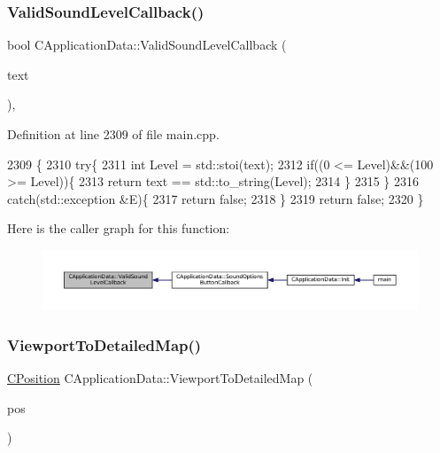 \subsubsection{\texorpdfstring{Valid\+Sound\+Level\+Callback()}{ValidSoundLevelCallback()}}
{\footnotesize\ttfamily bool C\+Application\+Data\+::\+Valid\+Sound\+Level\+Callback (\begin{DoxyParamCaption}\item[{const std\+::string \&}]{text }\end{DoxyParamCaption})\hspace{0.3cm}{\ttfamily [static]}, {\ttfamily [protected]}}



Definition at line 2309 of file main.\+cpp.


\begin{DoxyCode}
2309                                                                    \{
2310     \textcolor{keywordflow}{try}\{
2311         \textcolor{keywordtype}{int} Level = std::stoi(text);
2312         \textcolor{keywordflow}{if}((0 <= Level)&&(100 >= Level))\{
2313             \textcolor{keywordflow}{return} text == std::to\_string(Level);
2314         \}
2315     \}
2316     \textcolor{keywordflow}{catch}(std::exception &E)\{
2317         \textcolor{keywordflow}{return} \textcolor{keyword}{false};
2318     \}
2319     \textcolor{keywordflow}{return} \textcolor{keyword}{false};
2320 \}
\end{DoxyCode}
Here is the caller graph for this function\+:
\nopagebreak
\begin{figure}[H]
\begin{center}
\leavevmode
\includegraphics[width=350pt]{classCApplicationData_ae3216a4fccd68c9657d7e936b1a6df67_icgraph}
\end{center}
\end{figure}
\hypertarget{classCApplicationData_a2871f1b0855d14ed77db1abd83585d64}{}\label{classCApplicationData_a2871f1b0855d14ed77db1abd83585d64} 
\subsubsection{\texorpdfstring{Viewport\+To\+Detailed\+Map()}{ViewportToDetailedMap()}}
{\footnotesize\ttfamily \hyperlink{classCPosition}{C\+Position} C\+Application\+Data\+::\+Viewport\+To\+Detailed\+Map (\begin{DoxyParamCaption}\item[{const \hyperlink{classCPosition}{C\+Position} \&}]{pos }\end{DoxyParamCaption})\hspace{0.3cm}{\ttfamily [protected]}}



